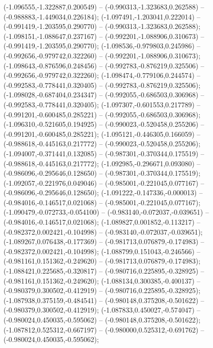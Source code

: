  (-1.096555,-1.322887,0.200549) -- (-0.990313,-1.323683,0.262588) -- (-0.988883,-1.449034,0.226184);
 (-1.097491,-1.203041,0.222014) -- (-0.991419,-1.203595,0.290770) -- (-0.990313,-1.323683,0.262588);
 (-1.098151,-1.088647,0.237167) -- (-0.992201,-1.088906,0.310673) -- (-0.991419,-1.203595,0.290770);
 (-1.098536,-0.979803,0.245986) -- (-0.992656,-0.979742,0.322260) -- (-0.992201,-1.088906,0.310673);
 (-1.098643,-0.876596,0.248456) -- (-0.992783,-0.876219,0.325506) -- (-0.992656,-0.979742,0.322260);
 (-1.098474,-0.779106,0.244574) -- (-0.992583,-0.778441,0.320405) -- (-0.992783,-0.876219,0.325506);
 (-1.098028,-0.687404,0.234347) -- (-0.992055,-0.686503,0.306968) -- (-0.992583,-0.778441,0.320405);
 (-1.097307,-0.601553,0.217789) -- (-0.991201,-0.600485,0.285221) -- (-0.992055,-0.686503,0.306968);
 (-1.096310,-0.521605,0.194925) -- (-0.990023,-0.520458,0.255206) -- (-0.991201,-0.600485,0.285221);
 (-1.095121,-0.446305,0.166059) -- (-0.988618,-0.445163,0.217772) -- (-0.990023,-0.520458,0.255206);
 (-1.094007,-0.371441,0.132085) -- (-0.987301,-0.370344,0.175519) -- (-0.988618,-0.445163,0.217772);
 (-1.092985,-0.296671,0.093080) -- (-0.986096,-0.295646,0.128650) -- (-0.987301,-0.370344,0.175519);
 (-1.092057,-0.221976,0.049046) -- (-0.985001,-0.221045,0.077167) -- (-0.986096,-0.295646,0.128650);
 (-1.091222,-0.147336,-0.000013) -- (-0.984016,-0.146517,0.021068) -- (-0.985001,-0.221045,0.077167);
 (-1.090479,-0.072733,-0.054100) -- (-0.983140,-0.072037,-0.039651) -- (-0.984016,-0.146517,0.021068);
 (-1.089827,0.001852,-0.113217) -- (-0.982372,0.002421,-0.104998) -- (-0.983140,-0.072037,-0.039651);
 (-1.089267,0.076438,-0.177369) -- (-0.981713,0.076879,-0.174983) -- (-0.982372,0.002421,-0.104998);
 (-1.088799,0.151043,-0.246566) -- (-0.981161,0.151362,-0.249620) -- (-0.981713,0.076879,-0.174983);
 (-1.088421,0.225685,-0.320817) -- (-0.980716,0.225895,-0.328925) -- (-0.981161,0.151362,-0.249620);
 (-1.088134,0.300385,-0.400137) -- (-0.980379,0.300502,-0.412919) -- (-0.980716,0.225895,-0.328925);
 (-1.087938,0.375159,-0.484541) -- (-0.980148,0.375208,-0.501622) -- (-0.980379,0.300502,-0.412919);
 (-1.087833,0.450027,-0.574047) -- (-0.980024,0.450035,-0.595062) -- (-0.980148,0.375208,-0.501622);
 (-1.087812,0.525312,-0.667197) -- (-0.980000,0.525312,-0.691762) -- (-0.980024,0.450035,-0.595062);
